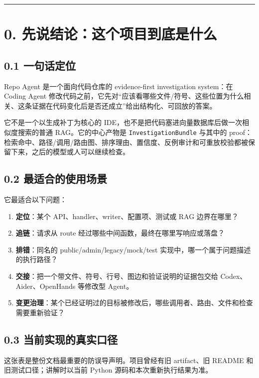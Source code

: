\documentclass[UTF8,12pt,openany]{ctexbook}
\begin{document}
\hrule

\section{0. 先说结论：这个项目到底是什么}

\subsection{0.1 一句话定位}

Repo Agent 是一个面向代码仓库的 evidence-first investigation system：在 Coding Agent 修改代码之前，它先对“应该看哪些文件/符号、这些位置为什么相关、这条证据在代码变化后是否还成立”给出结构化、可回放的答案。\par

它不是一个以生成补丁为核心的 IDE，也不是把代码塞进向量数据库后做一次相似度搜索的普通 RAG。它的中心产物是 \texttt{InvestigationBundle} 与其中的 proof：检索命中、路径/调用/路由图、排序理由、置信度、反例审计和可重放校验都被保留下来，之后的模型或人可以继续检查。\par

\subsection{0.2 最适合的使用场景}

它最适合以下问题：\par

\begin{enumerate}
\item \textbf{定位}：某个 API、handler、writer、配置项、测试或 RAG 边界在哪里？
\item \textbf{追链}：请求从 route 经过哪些中间函数，最终在哪里写响应或落盘？
\item \textbf{排错}：同名的 public/admin/legacy/mock/test 实现中，哪一个属于问题描述的执行路径？
\item \textbf{交接}：把一个带文件、符号、行号、图边和验证说明的证据包交给 Codex、Aider、OpenHands 等修改型 Agent。
\item \textbf{变更治理}：某个已经证明过的目标被修改后，哪些调用者、路由、文件和检查需要重新验证？
\end{enumerate}

\subsection{0.3 当前实现的真实口径}

这张表是整份文档最重要的防误导声明。项目曾经有旧 artifact、旧 README 和旧测试口径；讲解时以当前 Python 源码和本次重新执行结果为准。\par
\end{document}
